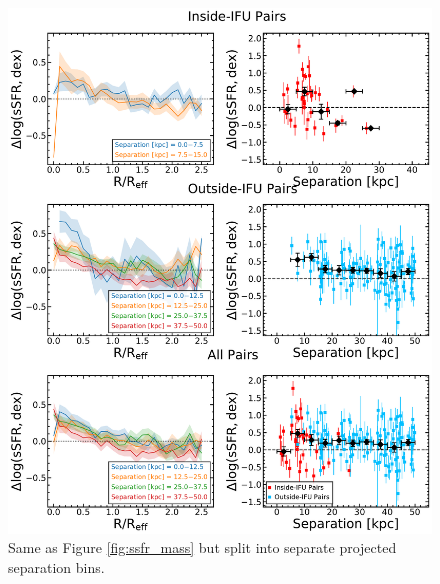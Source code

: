 \documentclass[iop,revtex4,twocolumn,apj,numberedappendix,appendixfloats]{emulateapj}
\begin{document}
\begin{figure}
\centering
\includegraphics[width=\linewidth]{fig/ssfr_sep.pdf}
\caption[The $\Delta$log(sSFR) split by projected separation.]{Same as Figure \ref{fig:ssfr_mass} but split into separate projected separation bins.}
\label{fig:ssfr_sep}
\end{figure}
\end{document}
